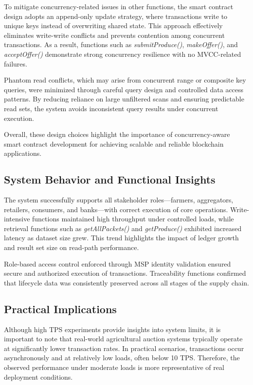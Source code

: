 \documentclass[12pt]{article}
\begin{document}
	To mitigate concurrency-related issues in other functions, the smart contract design adopts an append-only update strategy, where transactions write to unique keys instead of overwriting shared state. This approach effectively eliminates write-write conflicts and prevents contention among concurrent transactions. As a result, functions such as \textit{submitProduce()}, \textit{makeOffer()}, and \textit{acceptOffer()} demonstrate strong concurrency resilience with no MVCC-related failures.
	
	Phantom read conflicts, which may arise from concurrent range or composite key queries, were minimized through careful query design and controlled data access patterns. By reducing reliance on large unfiltered scans and ensuring predictable read sets, the system avoids inconsistent query results under concurrent execution.
	
	Overall, these design choices highlight the importance of concurrency-aware smart contract development for achieving scalable and reliable blockchain applications.
	
	\subsection{System Behavior and Functional Insights}
	
	The system successfully supports all stakeholder roles—farmers, aggregators, retailers, consumers, and banks—with correct execution of core operations. Write-intensive functions maintained high throughput under controlled loads, while retrieval functions such as \textit{getAllPackets()} and \textit{getProduce()} exhibited increased latency as dataset size grew. This trend highlights the impact of ledger growth and result set size on read-path performance.
	
	Role-based access control enforced through MSP identity validation ensured secure and authorized execution of transactions. Traceability functions confirmed that lifecycle data was consistently preserved across all stages of the supply chain.
	
	
	\subsection{Practical Implications}
	
	Although high TPS experiments provide insights into system limits, it is important to note that real-world agricultural auction systems typically operate at significantly lower transaction rates. In practical scenarios, transactions occur asynchronously and at relatively low loads, often below 10 TPS. Therefore, the observed performance under moderate loads is more representative of real deployment conditions.
	
\end{document}
